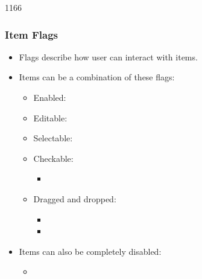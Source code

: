 \begin{slide}{1166}\frametitle{Item Flags}

\begin{itemize}
\item Flags describe how user can interact with items.
\item Items can be a combination of these flags:
  \begin{itemize}
  \item Enabled:  
  \item Editable:  
  \item Selectable:  
  \item Checkable:  
    \begin{itemize}
    \item {} 
    \end{itemize}
  \item Dragged and dropped:
    \begin{itemize}
    \item {} 
    \item {} 
    \end{itemize}
  \end{itemize}
\item Items can also be completely disabled:
  \begin{itemize}
  \item {} 
  \end{itemize}
\end{itemize}

\end{slide}

